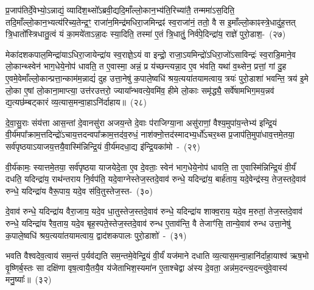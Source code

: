 {\anuvakamend[{ए॒वोपै॒तम॑स्मि॒न्त्रयो॑दश च}]}

प्र॒जा\-प॑तिर्दे॒वेभ्यो॒\-ऽन्नाद्यं॒ व्यादि॑श॒थ्सो᳚\-ऽब्रवी॒द्यदि॒माँल्लो॒का\-न॒भ्य॑ति॒\-रिच्या॑तै॒ तन्ममा॑\-ऽस॒दिति॒ तदि॒माँल्लो॒का\-न॒भ्यत्य॑रिच्य॒तेन्द्र॒ꣳ॒ राजा॑न॒\-मिन्द्र॑मधिरा॒जमिन्द्रꣴ॑ स्व॒राजा॑नं॒ ततो॒ वै स इ॒माँल्लो॒काꣴस्त्रे॒धा\-दु॑ह॒त्तत् त्रि॒धातो᳚स्त्रिधातु॒त्वं यं का॒मये॑ता\-ऽन्ना॒दः स्या॒दिति॒ तस्मा॑ ए॒तं त्रि॒धातुं॒ निर्व॑पे॒दिन्द्रा॑य॒ राज्ञे॑ पुरो॒डाश॒-~(२७)\ip

मेका॑\-दश\-कपाल॒मिन्द्रा॑या\-ऽधिरा॒जायेन्द्रा॑य स्व॒राज्ञे॒\-ऽयं वा इन्द्रो॒ राजा॒\-ऽयमिन्द्रो॑\-ऽधिरा॒जो॑\-ऽसाविन्द्रः॑ स्व॒राडि॒माने॒व लो॒कान्थ्स्वेन॑ भाग॒\-धेये॒नोप॑ धावति॒ त ए॒वास्मा॒ अन्नं॒ प्र य॑च्छन्त्यन्ना॒द ए॒व भ॑वति॒ यथा॑ व॒थ्सेन॒ प्रत्तां॒ गां दु॒ह ए॒वमे॒वेमाँल्लो॒कान्प्रत्ता॒न्काम॑म॒न्नाद्यं॑ दुह उत्ता॒नेषु॑ क॒पाले॒ष्वधि॑ श्रय॒त्यया॑तयामत्वाय॒ त्रयः॑ पुरो॒डाशा॑ भवन्ति॒ त्रय॑ इ॒मे लो॒का ए॒षां लो॒काना॒माप्त्या॒ उत्त॑रउत्तरो॒ ज्याया᳚न्भवत्ये॒वमि॑व॒ हीमे लो॒काः समृ॑द्ध्यै॒ सर्वे॑षामभिग॒मय॒न्नव॑ द्य॒त्यछ॑म्बट्कारं व्य॒त्यास॒मन्वा॒हा\-ऽनि॑र्दाहाय॥~(२८)\ip

{\anuvakamend[{पु॒रो॒डाश॒न्त्रयः॒ षड्विꣳ॑शतिश्च}]}

दे॒वा॒सु॒राः संय॑त्ता आस॒न्तां दे॒वानसु॑रा अजय॒न्ते दे॒वाः प॑राजिग्या॒ना असु॑राणां॒ वैश्य॒मुपा॑य॒न्तेभ्य॑ इन्द्रि॒यं वी॒र्य॑मपा᳚\-क्राम॒त्तदिन्द्रो॑\-ऽचाय॒त्तदन्वपा᳚\-क्राम॒त्तद॑व॒रुधं॒ नाश॑क्नो॒त्तद॑स्मा\-दभ्य॒र्धो॑\-ऽचर॒थ्स प्र॒जा\-प॑ति॒मुपा॑धाव॒त्तमे॒तया॒ सर्व॑पृष्ठया\-ऽयाजय॒त्त\-यै॒वास्मि॑न्निन्द्रि॒यं वी॒र्य॑मदधा॒द्य इ॑न्द्रि॒यका॑मो~-~(२९)\ip

वी॒र्य॑कामः॒ स्यात्तमे॒तया॒ सर्व॑पृष्ठया याजयेदे॒ता ए॒व दे॒वताः॒ स्वेन॑ भाग॒\-धेये॒नोप॑ धावति॒ ता ए॒वास्मि॑न्निन्द्रि॒यं वी॒र्यं॑ दधति॒ यदिन्द्रा॑य॒ राथ॑न्तराय नि॒र्वप॑ति॒ यदे॒वाग्नेस्तेज॒स्तदे॒वाव॑ रुन्धे॒ यदिन्द्रा॑य॒ बार्\mbox{}ह॑ताय॒ यदे॒वेन्द्र॑स्य॒ तेज॒स्तदे॒वाव॑ रुन्धे॒ यदिन्द्रा॑य वैरू॒पाय॒ यदे॒व स॑वि॒तुस्तेज॒स्त-~(३०)\ip

दे॒वाव॑ रुन्धे॒ यदिन्द्रा॑य वैरा॒जाय॒ यदे॒व धा॒तुस्तेज॒स्तदे॒वाव॑ रुन्धे॒ यदिन्द्रा॑य शाक्व॒राय॒ यदे॒व म॒रुतां॒ तेज॒स्तदे॒वाव॑ रुन्धे॒ यदिन्द्रा॑य रैव॒ताय॒ यदे॒व बृह॒स्पते॒स्तेज॒स्तदे॒वाव॑ रुन्ध ए॒ताव॑न्ति॒ वै तेजाꣳ॑सि॒ तान्ये॒वाव॑ रुन्ध उत्ता॒नेषु॑ क॒पाले॒ष्वधि॑ श्रय॒त्यया॑तयामत्वाय॒ द्वाद॑श\-कपालः पुरो॒डाशो॑~-~(३१)\ip

भवति वैश्वदेव॒त्वाय॑ सम॒न्तं प॒र्यव॑द्यति सम॒न्तमे॒वेन्द्रि॒यं वी॒र्यं॑ यज॑माने दधाति व्य॒त्यास॒मन्वा॒हानि॑र्दाहा॒याश्व॑ ऋष॒भो वृ॒ष्णिर्ब॒स्तः सा दक्षि॑णा वृष॒त्वायै॒तयै॒व य॑जेताभिश॒स्यमा॑न ए॒ताश्चेद्वा अ॑स्य दे॒वता॒ अन्न॑म॒दन्त्य॒दन्त्यु॑वे॒वास्य॑ मनु॒ष्याः᳚॥~(३२)\ip

